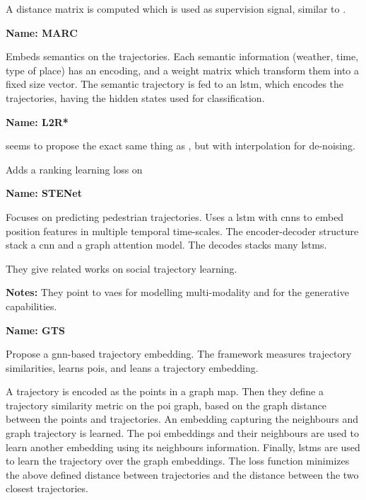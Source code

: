 A distance matrix is computed which is used as supervision signal, similar to \cite{yao2019computing}.


\textbf{Name: MARC}

\cite{may2020marc} Embeds semantics on the trajectories. Each semantic information (weather, time, type of place) has an encoding, and a weight matrix which transform them into a fixed size vector. The semantic trajectory is fed to an \gls{lstm}, which encodes the trajectories, having the hidden states used for classification.


\textbf{Name: L2R*}

\cite{chen2021embedding} seems to propose the exact same thing as \cite{yao2019computing}, but with interpolation for de-noising.

Adds a ranking learning loss on \cite{yao2019computing}


\textbf{Name: STENet}

\cite{zhang2021stenet} Focuses on predicting pedestrian trajectories. Uses a \gls{lstm} with \glspl{cnn} to embed position features in multiple temporal time-scales. The encoder-decoder structure stack a \gls{cnn} and a graph attention model. The decodes stacks many \glspl{lstm}. 

They give related works on social trajectory learning.

\textbf{Notes:} They point to \glspl{vae} for modelling multi-modality and for the generative capabilities. 


\textbf{Name: GTS}

\cite{han2021graph} Propose a \gls{gnn}-based trajectory embedding. The framework measures trajectory similarities, learns \glspl{poi}, and leans a trajectory embedding.

A trajectory is encoded as the points in a graph map. Then they define a trajectory similarity metric on the \gls{poi} graph, based on the graph distance between the points and trajectories. An embedding capturing the neighbours and graph trajectory is learned. The \gls{poi} embeddings and their neighbours are used to learn another embedding using its neighbours information. Finally, \glspl{lstm} are used to learn the trajectory over the graph embeddings. The loss function minimizes the above defined distance between trajectories and the distance between the two closest trajectories.

